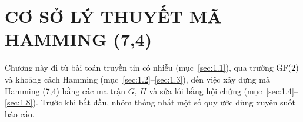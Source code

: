 \chapter{CƠ SỞ LÝ THUYẾT MÃ HAMMING (7,4)}
\label{chap:1}

Chương này đi từ bài toán truyền tin có nhiễu (mục~\ref{sec:1.1}), qua trường
$\mathrm{GF}(2)$ và khoảng cách Hamming (mục~\ref{sec:1.2}--\ref{sec:1.3}), đến việc xây
dựng mã Hamming (7,4) bằng các ma trận $G$, $H$ và sửa lỗi bằng hội chứng
(mục~\ref{sec:1.4}--\ref{sec:1.8}). Trước khi bắt đầu, nhóm thống nhất một số
quy ước dùng xuyên suốt báo cáo.

